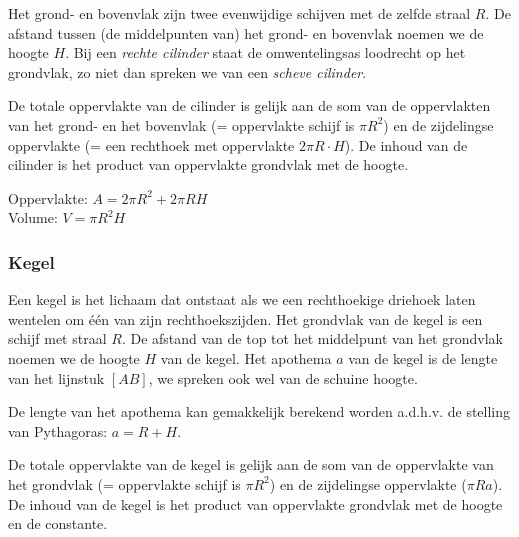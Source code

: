 Het grond- en bovenvlak zijn twee evenwijdige schijven met de zelfde straal $R$. De afstand tussen (de middelpunten van) het grond- en bovenvlak noemen we de hoogte $H$. Bij een \emph{rechte cilinder} staat de omwentelingsas loodrecht op het grondvlak, zo niet dan spreken we van een \emph{scheve cilinder}.

De totale oppervlakte van de cilinder is gelijk aan de som van de oppervlakten van het grond- en het bovenvlak (= oppervlakte schijf is $\pi R^2$) en de zijdelingse oppervlakte (= een rechthoek met oppervlakte $2\pi R\cdot H$). De inhoud van de cilinder is het product van oppervlakte grondvlak met de hoogte.



\begin{ftonthoud}
	
		Oppervlakte: $A=2\pi R^2 + 2\pi RH$
		\\
		Volume: $V=\pi R^2 H$
\end{ftonthoud}

\subsubsection{Kegel}
\begin{definitie}
	Een kegel is het lichaam dat ontstaat als we een rechthoekige driehoek laten wentelen om \'e\'en van zijn rechthoekszijden. Het grondvlak van de kegel is een schijf met straal $R$. De afstand van de top tot het middelpunt van het grondvlak noemen we de hoogte $H$ van de kegel. Het apothema $a$ van de kegel is de lengte van het lijnstuk $[AB]$, we spreken ook wel van de schuine hoogte.
\end{definitie}
De lengte van het apothema kan gemakkelijk berekend worden a.d.h.v. de stelling van Pythagoras: $a=R+H$.

De totale oppervlakte van de kegel is gelijk aan de som van de oppervlakte van het grondvlak (= oppervlakte schijf is $\pi R^2$) en de zijdelingse oppervlakte ($\pi R a$). De inhoud van de kegel is het product van oppervlakte grondvlak met de hoogte en de constante.

